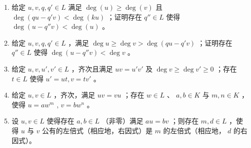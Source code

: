 \begin{enumerate}
\def\labelenumi{\alph{enumi})}
\setcounter{enumi}{1}
\item
  给定 \(u, v, q, q' \in L\) 满足 \(\deg(u) \geqslant \deg(v)\) 且 \(\deg(qu - q'v) < \deg(ku)\) ；证明存在 \(q'' \in L\) 使得 \(\deg(u - q''v) < \deg(u)\) 。
\item
  给定 \(u, v, q, q' \in L\) ，满足 \(\deg u \geqslant \deg v > \deg (qu - q'v)\) ；证明存在 \(q'' \in L\) 使得 \(\deg (u - q''v) < \deg v\) 。
\item
  给定 \(u, v, u', v' \in L\) ，齐次且满足 \(uv = u'v'\) 及 \(\deg v \geqslant \deg v' \geqslant 0\) ；存在 \(t \in L\) 使得 \(u' = ut, v = tv'\) 。
\item
  给定 \(u, v \in L\) ，齐次，满足 \(uv = vu\) ；存在 \(w \in L\) 、 \(a, b \in K\) 与 \(m, n \in K\) ，使得 \(u = aw^m\) , \(v = bw^n\) 。
\item
  设 \(u, v \in L\) 使得存在 \(a, b \in L\) （非零）满足 \(au = bv\) ；则存在 \(m, d \in L\) ，使得 \(u\) 与 \(v\) 公有的左倍式（相应地，右因式）是 \(m\) 的左倍式（相应地， \(d\) 的右因式）。
\end{enumerate}

